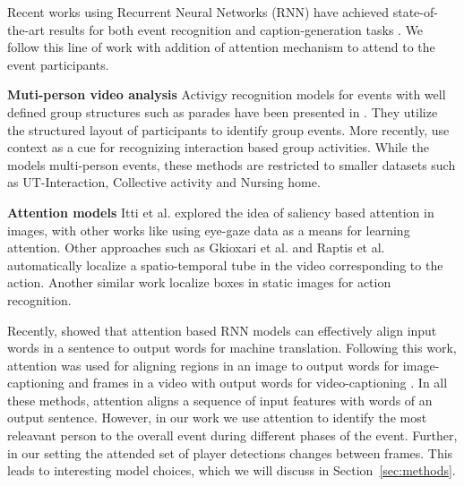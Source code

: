 Recent works using Recurrent Neural Networks (RNN) have achieved
state-of-the-art results for both event recognition and caption-generation
tasks \cite{Donahue_arxiv14,Ng_arxiv15,Srivastava_2015,Yao_arxiv15}.
We follow this line of work with addition of attention mechanism
to attend to the event participants.

\noindent \textbf{Muti-person video analysis}
Activigy recognition models for events with well defined group structures such
as parades have been presented in
\cite{Vaswani_CVPR03,Intille_CVIU01,Moore_AAAI02,Khan_ACM05}.  They utilize the
structured layout of participants to identify group events. More
recently, \cite{Lan_PAMI12,Choi_ICCV09,Khodabandeh_arxiv15} use context as a
cue for recognizing interaction based group activities.  While the models
multi-person events, these methods are restricted to smaller
datasets such as UT-Interaction\cite{Ryoo_10}, Collective activity
\cite{Choi_ICCV09} and Nursing home\cite{Lan_PAMI12}.

\noindent \textbf{Attention models}
Itti et al. \cite{Itti_PAMI98} explored the idea of saliency based attention in
images, with other works like \cite{Shapovalova_NIPS13} using eye-gaze data as
a means for learning attention.
Other approaches such as Gkioxari et al. \cite{Gkioxari_arxiv14} and Raptis et al. \cite{Raptis_CVPR12}
automatically localize a spatio-temporal tube in the video corresponding to the action.
Another similar work\cite{Gkioxari_ICCV15} localize boxes in static images
for action recognition.

Recently, \cite{Bahdnau_arxiv14} showed that
attention based RNN models can effectively align input words in a sentence to
output words for machine translation.  Following this work, attention was used
for aligning regions in an image to output words for image-captioning
\cite{Xu_arxiv15} and frames in a video with output words for video-captioning
\cite{Yao_arxiv15}.  In all these methods, attention aligns a sequence of input
features with words of an output sentence. However, in our work we use
attention to identify the most releavant person to the overall event during
different phases of the event.  Further, in our setting the attended set of
player detections changes between frames. This leads to interesting
model choices, which we will discuss in Section~\ref{sec:methods}.

